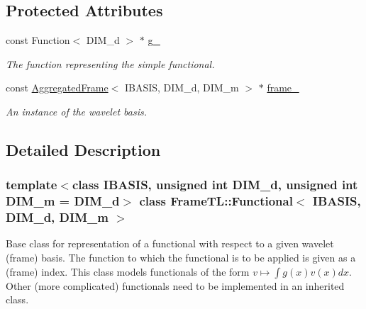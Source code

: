 \subsection*{Protected Attributes}
\begin{CompactItemize}
\item 
\hypertarget{classFrameTL_1_1Functional_1946477dbb2a1fa65a48d842476d0407}{
const Function$<$ DIM\_\-d $>$ $\ast$ \hyperlink{classFrameTL_1_1Functional_1946477dbb2a1fa65a48d842476d0407}{g\_\-}}
\label{classFrameTL_1_1Functional_1946477dbb2a1fa65a48d842476d0407}

\begin{CompactList}\small\item\em The function representing the simple functional. \item\end{CompactList}\item 
\hypertarget{classFrameTL_1_1Functional_bdbd552c7595fb48eebf7b858f7eb3fb}{
const \hyperlink{classFrameTL_1_1AggregatedFrame}{AggregatedFrame}$<$ IBASIS, DIM\_\-d, DIM\_\-m $>$ $\ast$ \hyperlink{classFrameTL_1_1Functional_bdbd552c7595fb48eebf7b858f7eb3fb}{frame\_\-}}
\label{classFrameTL_1_1Functional_bdbd552c7595fb48eebf7b858f7eb3fb}

\begin{CompactList}\small\item\em An instance of the wavelet basis. \item\end{CompactList}\end{CompactItemize}


\subsection{Detailed Description}
\subsubsection*{template$<$class IBASIS, unsigned int DIM\_\-d, unsigned int DIM\_\-m = DIM\_\-d$>$ class FrameTL::Functional$<$ IBASIS, DIM\_\-d, DIM\_\-m $>$}

Base class for representation of a functional with respect to a given wavelet (frame) basis. The function to which the functional is to be applied is given as a (frame) index. This class models functionals of the form $v \mapsto \int g(x) v(x) dx$. Other (more complicated) functionals need to be implemented in an inherited class. 

